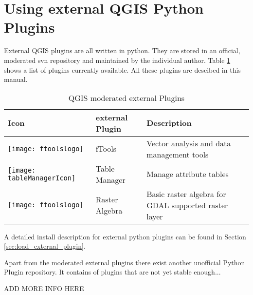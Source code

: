 
\section{Using external QGIS Python Plugins}\label{sec:external_plugins}

\updatedisclaimer

External QGIS plugins are all written in python. They are stored in 
an official, moderated svn repository and maintained by the individual 
author. Table \ref{tab:external_plugins} shows a list of plugins 
currently available. All these plugins are descibed in this manual.

\begin{table}[H]
\centering
\caption{QGIS moderated external Plugins}\label{tab:external_plugins}\medskip
\small
 \begin{tabular}{|l|l|p{4in}|}
\hline \textbf{Icon} & \textbf{external Plugin} & \textbf{Description}\\
\hline
\texttt{[image: ftoolslogo]}
 & fTools \index{plugins!fTools} & Vector analysis and data management tools\\
\hline
\texttt{[image: tableManagerIcon]}
 & Table Manager \index{plugins!Table Manager}& Manage attribute tables \\
\hline
\texttt{[image: ftoolslogo]}
 & Raster Algebra \index{plugins!Raster Algebra}& Basic raster algebra 
for GDAL supported raster layer\\
\hline
\end{tabular}
\end{table}

A detailed install description for external python plugins can be found in 
Section \ref{sec:load_external_plugin}.


Apart from the moderated external plugins there exist another unofficial 
Python Plugin repository. It contains of plugins that are not yet stable 
enough... 

ADD MORE INFO HERE 

\begin{Tip} \caption{\textsc{Add more external Plugins}}
\end{Tip}




